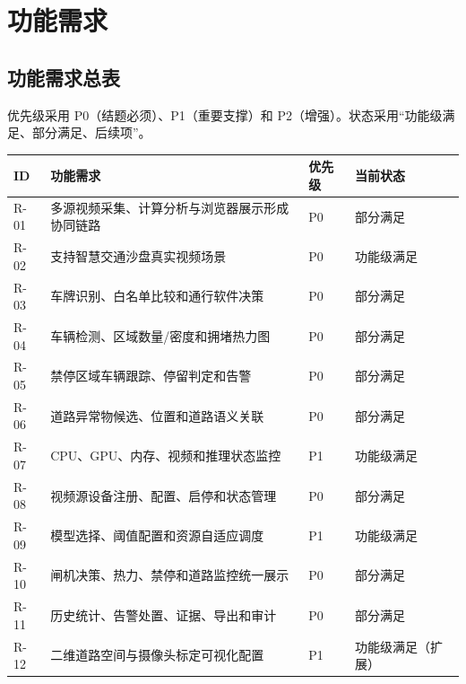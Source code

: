 \section{功能需求}\label{requirements-ux529fux80fdux9700ux6c42}

\subsection{功能需求总表}\label{requirements-ux529fux80fdux9700ux6c42ux603bux8868}

优先级采用 P0（结题必须）、P1（重要支撑）和 P2（增强）。状态采用``功能级满足、部分满足、后续项''。

\begin{longtable}[]{@{}
  >{\raggedright\arraybackslash}p{}
  >{\raggedright\arraybackslash}p{}
  >{\centering\arraybackslash}p{}
  >{\raggedright\arraybackslash}p{}@{}}
\toprule\noalign{}
\begin{minipage}[b]{\linewidth}\raggedright
ID
\end{minipage} & \begin{minipage}[b]{\linewidth}\raggedright
功能需求
\end{minipage} & \begin{minipage}[b]{\linewidth}\centering
优先级
\end{minipage} & \begin{minipage}[b]{\linewidth}\raggedright
当前状态
\end{minipage} \\
\midrule\noalign{}
\endhead
\bottomrule\noalign{}
\endlastfoot
R-01 & 多源视频采集、计算分析与浏览器展示形成协同链路 & P0 & 部分满足 \\
R-02 & 支持智慧交通沙盘真实视频场景 & P0 & 功能级满足 \\
R-03 & 车牌识别、白名单比较和通行软件决策 & P0 & 部分满足 \\
R-04 & 车辆检测、区域数量/密度和拥堵热力图 & P0 & 部分满足 \\
R-05 & 禁停区域车辆跟踪、停留判定和告警 & P0 & 部分满足 \\
R-06 & 道路异常物候选、位置和道路语义关联 & P0 & 部分满足 \\
R-07 & CPU、GPU、内存、视频和推理状态监控 & P1 & 功能级满足 \\
R-08 & 视频源设备注册、配置、启停和状态管理 & P0 & 部分满足 \\
R-09 & 模型选择、阈值配置和资源自适应调度 & P1 & 功能级满足 \\
R-10 & 闸机决策、热力、禁停和道路监控统一展示 & P0 & 部分满足 \\
R-11 & 历史统计、告警处置、证据、导出和审计 & P0 & 部分满足 \\
R-12 & 二维道路空间与摄像头标定可视化配置 & P1 & 功能级满足（扩展） \\
\end{longtable}

